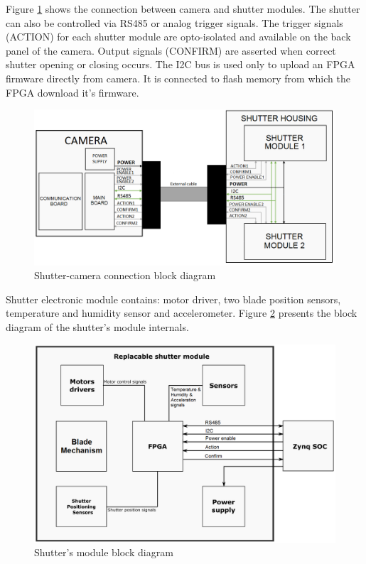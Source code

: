 Figure \ref{fig:shutconn} shows the connection between camera and shutter modules. The shutter can also be controlled via RS485 or analog trigger signals. The trigger signals (ACTION) for each shutter module are opto-isolated and available on the back panel of the camera. Output signals (CONFIRM) are asserted when correct shutter opening or closing occurs.
The I2C bus is used only to upload an FPGA firmware directly from camera. It is connected to flash memory from which the FPGA download it's firmware.

\begin{figure}[H]
\centering
\includegraphics[width=1\textwidth]{pict/shutter_connection.png}
\caption{Shutter-camera connection block diagram}
\label{fig:shutconn}
\end{figure}

Shutter electronic module contains: motor driver, two blade position sensors, temperature and humidity sensor and accelerometer. Figure \ref{fig:shutblk} presents the block diagram of the shutter’s module internals. 

\begin{figure}[H]
\centering
\includegraphics[width=1\textwidth]{pict/shut_block.png}
\caption{Shutter's module block diagram}
\label{fig:shutblk}
\end{figure}

